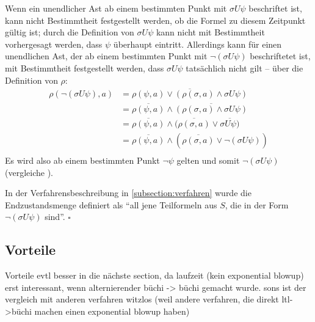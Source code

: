 Wenn ein unendlicher Ast ab einem bestimmten Punkt mit $\sigma U\psi$ beschriftet ist, kann nicht Bestimmtheit festgestellt werden, ob die Formel zu diesem Zeitpunkt gültig ist; durch die Definition von $\sigma U\psi$ kann nicht mit Bestimmtheit vorhergesagt werden, dass $\psi$ überhaupt eintritt. Allerdings kann für einen unendlichen Ast, der ab einem bestimmten Punkt mit $\lnot(\sigma U\psi)$ beschriftetet ist, mit Bestimmtheit festgestellt werden, dass $\sigma U\psi$ tatsächlich nicht gilt -- über die Definition von $\rho$:
\begin{equation}
\begin{split}
    \rho(\lnot(\sigma U\psi), a) &= \overline{\rho(\psi, a) \lor (\rho(\sigma, a) \land \sigma U\psi)}\\
    &= \overline{\rho(\psi, a)} \land \overline{(\rho(\sigma, a) \land \sigma U\psi)}\\
    &= \overline{\rho(\psi, a)} \land (\overline{\rho(\sigma, a)} \lor \overline{\sigma U\psi)}\\
    &= \overline{\rho(\psi, a)} \land (\overline{\rho(\sigma, a)} \lor \lnot(\sigma U\psi))\\
\end{split}
\end{equation}
Es wird also ab einem bestimmten Punkt $\lnot\psi$ gelten und somit $\lnot(\sigma U\psi)$ (vergleiche \cite{vardi+96}).

In der Verfahrensbeschreibung in \ref{subsection:verfahren} wurde die Endzustandsmenge definiert als "`all jene Teilformeln aus $S$, die in der Form $\lnot(\sigma U\psi)$ sind"'. $\square$

\subsection{Vorteile}
Vorteile evtl besser in die nächste section, da laufzeit (kein exponential blowup) erst interessant, wenn alternierender büchi -> büchi gemacht wurde. sons ist der vergleich mit anderen verfahren witzlos (weil andere verfahren, die direkt ltl->büchi machen einen exponential blowup haben)